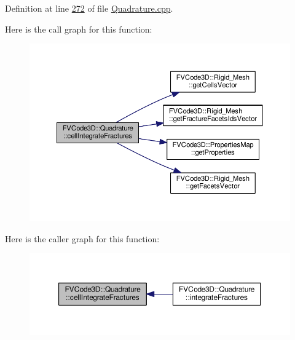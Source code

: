 Definition at line \hyperlink{Quadrature_8cpp_source_l00272}{272} of file \hyperlink{Quadrature_8cpp_source}{Quadrature.\+cpp}.



Here is the call graph for this function\+:
\nopagebreak
\begin{figure}[H]
\begin{center}
\leavevmode
\includegraphics[width=350pt]{classFVCode3D_1_1Quadrature_a2c3240f24eed6f871394ca3eafbffc78_cgraph}
\end{center}
\end{figure}




Here is the caller graph for this function\+:
\nopagebreak
\begin{figure}[H]
\begin{center}
\leavevmode
\includegraphics[width=350pt]{classFVCode3D_1_1Quadrature_a2c3240f24eed6f871394ca3eafbffc78_icgraph}
\end{center}
\end{figure}


